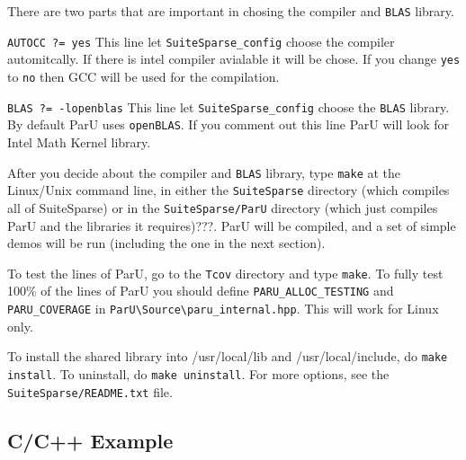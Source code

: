 \documentclass[12pt]{article}
\begin{document}
There are two parts that are important in chosing the compiler and 
\verb'BLAS' library.


\verb 'AUTOCC ?= yes' This line let \verb'SuiteSparse_config' choose the 
compiler automitcally. If there is intel compiler avialable it will be chose. 
If you change \verb'yes' to \verb'no' then GCC will be used for the compilation.


\verb 'BLAS ?= -lopenblas' This line let \verb'SuiteSparse_config' choose the 
\verb'BLAS' library. By default ParU uses  \verb'openBLAS'. If you comment out
this line ParU will look for Intel Math Kernel library. 

After you decide about the compiler and \verb'BLAS' library, type \verb'make' at 
the Linux/Unix command line, in either the 
\verb'SuiteSparse' directory (which compiles all of SuiteSparse) or in the 
\verb'SuiteSparse/ParU' directory (which just compiles ParU and the 
libraries it requires)???.  ParU will be compiled, and a set of simple demos 
will be run (including the one in the next section).

To  test the lines of ParU, go to the \verb'Tcov'
directory and type \verb'make'.  To fully test 100\% of the lines of ParU you 
should define \verb'PARU_ALLOC_TESTING' and \verb'PARU_COVERAGE' in
\verb'ParU\Source\paru_internal.hpp'.
This will work for Linux only.

To install the shared library
into /usr/local/lib and /usr/local/include, do {\tt make install}.
To uninstall, do {\tt make uninstall}.
For more options, see the {\tt SuiteSparse/README.txt} file.

\subsection{C/C++ Example}
\end{document}
